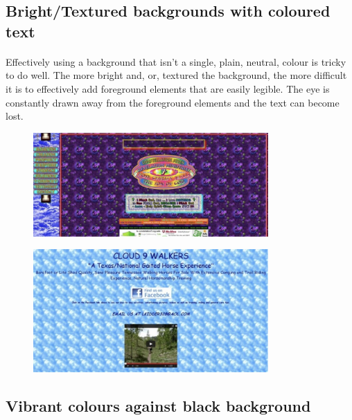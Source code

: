 \subsection{Bright/Textured backgrounds with coloured text}
\paragraph{} Effectively using a background that isn't a single, plain, neutral, colour is tricky to do well. The more bright and, or, textured the background, the more difficult it is to effectively add foreground elements that are easily legible. The eye is constantly drawn away from the foreground elements and the text can become lost.


\begin{figure}[H]
    \centering
    \includegraphics[width=0.8\textwidth]{figures/bad-colours-bright-background-1}
    \label{fig:bad-colours-bright-background-1}
    \caption{}
\end{figure}


\begin{figure}[H]
    \centering
    \includegraphics[width=0.8\textwidth]{figures/bad-colours-bright-background-2}
    \label{fig:bad-colours-bright-background-2}
    \caption{}
\end{figure}



\subsection{Vibrant colours against black background}

